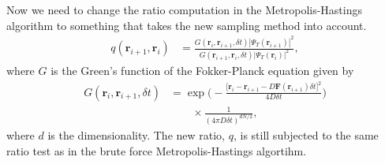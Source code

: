 \documentclass[
    a4paper, aps, twocolumn, floatfix, superscriptaddress,
    nofootinbib]{revtex4-1}
\newcommand{\vf}{\mathbf}
\newcommand{\1}{\mathds{1}}
\begin{document}
            Now we need to change the ratio computation in the
            Metropolis-Hastings algorithm to something that takes the new
            sampling method into account.
            \begin{align}
                q(\vf{r}_{i + 1}, \vf{r}_i)
                &=
                \frac{
                    G(\vf{r}_{i}, \vf{r}_{i + 1}, \delta t)
                    \left|\Psi_T(\vf{r}_{i + 1})\right|^2
                }
                {
                    G(\vf{r}_{i + 1}, \vf{r}_{i}, \delta t)
                    \left|\Psi_T(\vf{r}_{i})\right|^2
                },
            \end{align}
            where $G$ is the Green's function of the Fokker-Planck equation
            given by
            \begin{align}
                G(\vf{r}_{i}, \vf{r}_{i + 1}, \delta t)
                &=
                \exp\Biggl(
                    -\frac{\bigl[
                        \vf{r}_{i}
                        - \vf{r}_{i + 1}
                        - D\vf{F}(\vf{r}_{i + 1})\delta t
                    \bigr]^2}{4D\delta t}
                \Biggr)
                \nonumber \\
                &\qquad
                \times
                \frac{1}{(4\pi D\delta t)^{dN/2}},
            \end{align}
            where $d$ is the dimensionality. The new ratio, $q$, is still
            subjected to the same ratio test as in the brute force
            Metropolis-Hastings algortihm.
\end{document}
